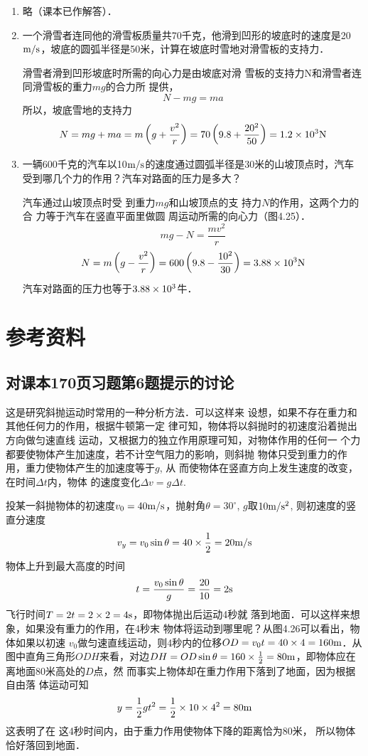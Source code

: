 \begin{enumerate}
\item  略（课本已作解答）．

\item  一个滑雪者连同他的滑雪板质量共70千克，他滑到凹形的坡底时的速度是20$\text{m}/\text{s}$，坡底的圆弧半径是50米，计算在坡底时雪地对滑雪板的支持力．

\begin{solution}
    滑雪者滑到凹形坡底时所需的向心力是由坡底对滑
    雪板的支持力N和滑雪者连同滑雪板的重力$mg$的合力所
    提供，
\[    N-mg=ma\]
    所以，坡底雪地的支持力
\[N=mg+ma=m\left(g+\frac{v^2}{r}\right)=70\left(9.8+\frac{20^2}{50}\right)=1.2\times 10^3{\rm N}\]
\end{solution}
\item  一辆600千克的汽车以10$\text{m}/\text{s}$的速度通过圆弧半径是30米的山坡顶点时，汽车受到哪几个力的作用？汽车对路面的压力是多大？


\begin{solution}
    汽车通过山坡顶点时受
    到重力$mg$和山坡顶点的支
    持力$N$的作用，这两个力的合
    力等于汽车在竖直平面里做圆
    周运动所需的向心力（图4.25）．
\[mg-N=\frac{mv^2}{r}\]
\[N=m\left(g-\frac{v^2}{r}\right)=600\left(9.8-\frac{10^2}{30}\right)=3.88\times 10^3{\rm N}\]
汽车对路面的压力也等于$3.88\times10^3$牛．
\end{solution}

\end{enumerate}


\section{参考资料}
\subsection{对课本170页习题第6题提示的讨论}
这是研究斜抛运动时常用的一种分析方法．可以这样来
设想，如果不存在重力和其他任何力的作用，根据牛顿第一定
律可知，物体将以斜抛时的初速度沿着抛出方向做匀速直线
运动，又根据力的独立作用原理可知，对物体作用的任何一
个力都要使物体产生加速度，若不计空气阻力的影响，则斜抛
物体只受到重力的作用，重力使物体产生的加速度等于$g$, 从
而使物体在竖直方向上发生速度的改变，在时间$\Delta t$内，物体
的速度变化$\Delta v=g\Delta t$.

投某一斜抛物体的初速度$v_0=40\text{m}/\text{s}$，抛射角$\theta=30^{\circ}$,
$g$取$10\text{m}/\text{s}^2$, 则初速度的竖直分速度
$$v_y=v_0\sin\theta=40\times\frac{1}{2}=20\text{m}/\text{s}$$
物体上升到最大高度的时间
\[t=\frac{v_0\sin\theta}{g}=\frac{20}{10}=2{\rm s}\]
飞行时间$T=2t=2\times2=4{\rm s}$，即物体抛出后运动4秒就
落到地面．可以这样来想象，如果没有重力的作用，在4秒末
物体将运动到哪里呢？从图4.26可以看出，物体如果以初速
$v_0$做匀速直线运动，则4秒内的位移$OD=v_0t=40\times4=
160{\rm m}$．从图中直角三角形$ODH$来看，对边$DH=OD\sin\theta=
160\times\frac{1}{2}=80{\rm m}$，即物体应在离地面80米高处的$D$点，然
而事实上物体却在重力作用下落到了地面，因为根据自由落
体运动可知
\[y=\frac{1}{2}gt^2=\frac{1}{2}\times 10\times 4^2=80{\rm m}\]
这表明了在
这4秒时间内，由于重力作用使物体下降的距离恰为80米，
所以物体恰好落回到地面．

